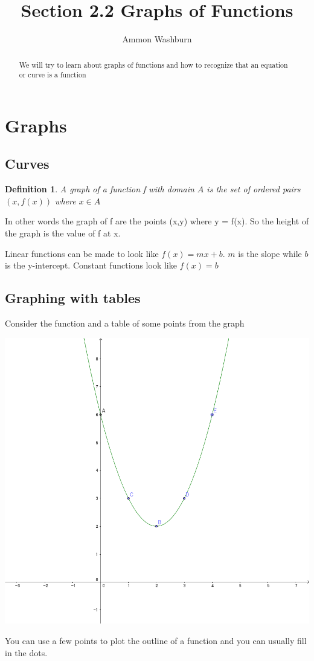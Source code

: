 \documentclass{tufte-handout}
\title{Section 2.2 Graphs of Functions}
\author[AW]{Ammon Washburn}
\newtheorem{mydef}{Definition}
\begin{document}
\maketitle

\begin{abstract}
We will try to learn about graphs of functions and how to recognize that an equation or curve is a function
\end{abstract}
\section{Graphs}
\subsection{Curves}
\begin{mydef}
A graph of a function f with domain $A$ is the set of ordered pairs $(x,f(x))$ where $x \in A$
\end{mydef}

In other words the graph of f are the points (x,y) where y = f(x).  So the height of the graph is the value of f at x.

Linear functions can be made to look like $f(x) = mx+b$.  $m$ is the slope while $b$ is the y-intercept.  Constant functions look like $f(x) = b$
\subsection{Graphing with tables}
Consider the function and a table of some points from the graph

\begin{marginfigure}
  \includegraphics[width=\linewidth]{2-2GraphTable.png}
  \caption{You can use a few points to plot the outline of a function and you can usually fill in the dots.}
  \label{fig:table}
\end{marginfigure}
\end{document}
